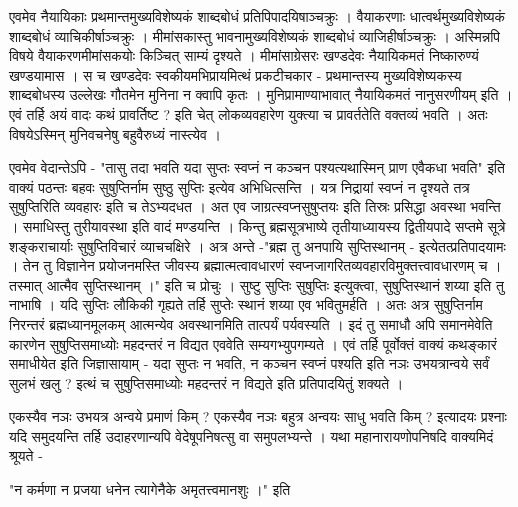 {एवमेव नैयायिकाः प्रथमान्तमुख्यविशेष्यकं शाब्दबोधं प्रतिपिपादयिषाञ्चक्रुः । वैयाकरणाः धात्वर्थमुख्यविशेष्यकं शाब्दबोधं व्याचिकीर्षाञ्चक्रुः । मीमांसकास्तु भावनामुख्यविशेष्यकं शाब्दबोधं व्याजिहीर्षाञ्चक्रुः । अस्मिन्नपि विषये वैयाकरणमीमांसकयोः किञ्चित् साम्यं दृश्यते । मीमांसाग्रेसरः खण्डदेवः नैयायिकमतं निष्कारुण्यं खण्डयामास । स च खण्डदेवः स्वकीयमभिप्रायमित्थं प्रकटीचकार - प्रथमान्तस्य मुख्यविशेष्यकस्य शाब्दबोधस्य उल्लेखः गौतमेन मुनिना न क्वापि कृतः । मुनिप्रामाण्याभावात् नैयायिकमतं नानुसरणीयम् इति । एवं तर्हि अयं वादः कथं प्रावर्तिष्ट ? इति चेत् लोकव्यवहारेण युक्त्या च प्रावर्ततेति वक्तव्यं भवति । अतः विषयेऽस्मिन् मुनिवचनेषु बहुवैरुध्यं नास्त्येव । 

एवमेव वेदान्तेऽपि - "तासु तदा भवति यदा सुप्तः स्वप्नं न कञ्चन पश्यत्यथास्मिन् प्राण एवैकधा भवति" इति वाक्यं पठन्तः बहवः सुषुप्तिर्नाम सुष्ठु सुप्तिः इत्येव अभिधित्सन्ति । यत्र निद्रायां स्वप्नं न दृश्यते तत्र सुषुप्तिरिति व्यवहारः इति च तेऽभ्यदधत । अत एव जाग्रत्स्वप्नसुषुप्तयः इति तिस्रः प्रसिद्धा अवस्था भवन्ति । समाधिस्तु तुरीयावस्था इति वादं मण्डयन्ति । किन्तु ब्रह्मसूत्रभाष्ये तृतीयाध्यायस्य द्वितीयपादे सप्तमे सूत्रे शङ्कराचार्याः सुषुप्तिविचारं व्याचचक्षिरे । अत्र अन्ते -"ब्रह्म तु अनपायि सुप्तिस्थानम् - इत्येतत्प्रतिपादयामः । तेन तु विज्ञानेन प्रयोजनमस्ति जीवस्य ब्रह्मात्मत्वावधारणं स्वप्नजागरितव्यवहारविमुक्तत्त्वावधारणम् च । तस्मात् आत्मैव सुप्तिस्थानम् ।" इति च प्रोचुः । सुष्टु सुप्तिः सुषुप्तिः इत्युक्त्वा, सुषुप्तिस्थानं शय्या इति तु नाभाषि । यदि सुप्तिः लौकिकी गृह्यते तर्हि सुप्तेः स्थानं शय्या एव भवितुमर्हति । अतः अत्र सुषुप्तिर्नाम निरन्तरं ब्रह्मध्यानमूलकम् आत्मन्येव अवस्थानमिति तात्पर्यं पर्यवस्यति । इदं तु समाधौ अपि समानमेवेति कारणेन सुषुप्तिसमाध्योः महदन्तरं न विद्यत एववेति सम्यगभ्युपगम्यते । एवं तर्हि पूर्वोक्तं वाक्यं कथङ्कारं समाधीयेत इति जिज्ञासायाम् - यदा सुप्तः न भवति, न कञ्चन स्वप्नं पश्यति इति नञः उभयत्रान्वये सर्वं सुलभं खलु ? इत्थं च सुषुप्तिसमाध्योः महदन्तरं न विद्यते इति प्रतिपादयितुं शक्यते । 

एकस्यैव नञः उभयत्र अन्वये प्रमाणं किम् ? एकस्यैव नञः बहुत्र अन्वयः साधु भवति किम् ? इत्यादयः प्रश्नाः यदि समुदयन्ति तर्हि उदाहरणान्यपि वेदेषूपनिषत्सु वा समुपलभ्यन्ते । यथा महानारायणोपनिषदि वाक्यमिदं श्रूयते - 

"न कर्मणा न प्रजया धनेन त्यागेनैके अमृतत्त्वमानशुः ।" इति

}
